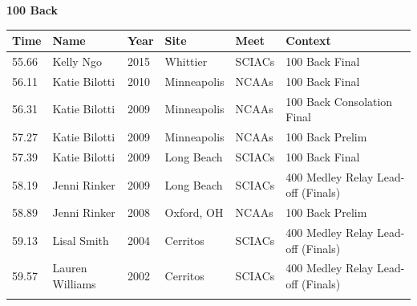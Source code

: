 \noindent\begin{minipage}[t]{0.98\textwidth}
\centering
\textbf{\textcolor{teamprimary}{100 Back}}\par
\vspace{0.5em}
\centering
\small
\renewcommand{\arraystretch}{1.0}
\setlength{\tabcolsep}{4pt}
\begin{tabular}{@{}p{2.0cm}p{3.2cm}p{1.2cm}p{2.0cm}p{2.0cm}p{2.5cm}@{}}
\toprule
\textbf{Time} & \textbf{Name} & \textbf{Year} & \textbf{Site} & \textbf{Meet} & \textbf{Context} \\
\midrule
55.66 & Kelly Ngo & 2015 & Whittier & SCIACs & 100 Back Final \\
56.11 & Katie Bilotti & 2010 & Minneapolis & NCAAs & 100 Back Final \\
56.31 & Katie Bilotti & 2009 & Minneapolis & NCAAs & 100 Back Consolation Final \\
57.27 & Katie Bilotti & 2009 & Minneapolis & NCAAs & 100 Back Prelim \\
57.39 & Katie Bilotti & 2009 & Long Beach & SCIACs & 100 Back Final \\
58.19 & Jenni Rinker & 2009 & Long Beach & SCIACs & 400 Medley Relay Lead-off (Finals) \\
58.89 & Jenni Rinker & 2008 & Oxford, OH & NCAAs & 100 Back Prelim \\
59.13 & Lisal Smith & 2004 & Cerritos & SCIACs & 400 Medley Relay Lead-off (Finals) \\
59.57 & Lauren Williams & 2002 & Cerritos & SCIACs & 400 Medley Relay Lead-off (Finals) \\
\bottomrule
\vspace{0.5em}
\end{tabular}
\end{minipage}
\vspace{1.2em}

